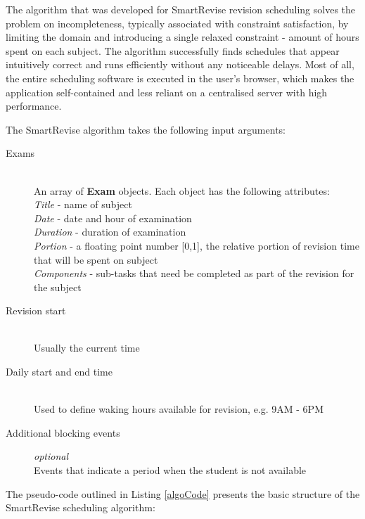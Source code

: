 \documentclass[bsc,frontabs,twoside,singlespacing,parskip]{infthesis}     %
\begin{document}
		The algorithm that was developed for SmartRevise revision scheduling solves the problem on incompleteness, typically associated with constraint satisfaction,  by limiting the domain and introducing a single relaxed constraint - amount of hours spent on each subject. The algorithm successfully finds schedules that appear intuitively correct and runs efficiently without any noticeable delays. Most of all, the entire scheduling software is executed in the user's browser, which makes the application self-contained and less reliant on a centralised server with high performance.
		
		The SmartRevise algorithm takes the following input arguments:
		
		\begin{description}
			\item[Exams] \hfill \\
				An array of \textbf{Exam} objects. Each object has the following attributes: \\
				\textit{Title} - name of subject\\
				\textit{Date} - date and hour of examination\\
				\textit{Duration} - duration of examination\\
				\textit{Portion} - a floating point number [0,1], the relative portion of revision time that will be spent on subject\\
				\textit{Components} - sub-tasks that need be completed as part of the revision for the subject
			\item[Revision start] \hfill \\
				Usually the current time
			\item[Daily start and end time] \hfill \\
				Used to define waking hours available for revision, e.g. 9AM - 6PM
			\item[Additional blocking events] \textit{optional} \hfill \\
				Events that indicate a period when the student is not available
		\end{description}
	
		The pseudo-code outlined in Listing \ref{algoCode} presents the basic structure of the SmartRevise scheduling algorithm:
	
\end{document}
